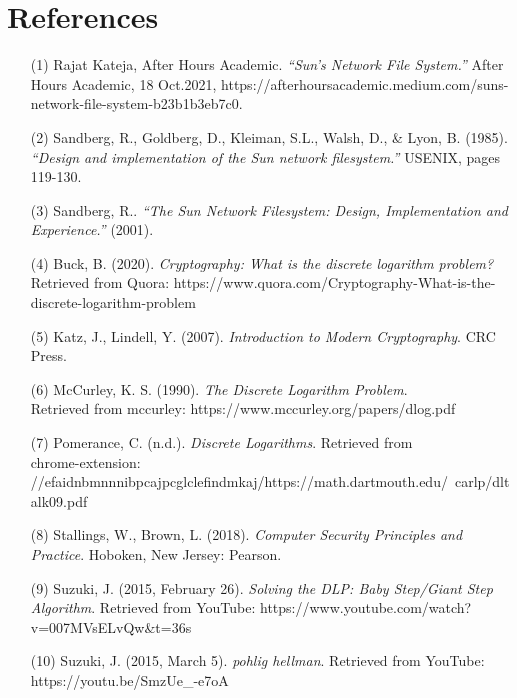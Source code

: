 \documentclass{article}
\begin{document}
\section{References} 

\begin{itemize}
    \item[(1)]Rajat Kateja, After Hours Academic. \textit{“Sun's Network File System.”} After Hours Academic, 18 Oct.2021, https://afterhoursacademic.medium.com/suns-network-file-system-b23b1b3eb7c0. 

    \item[(2)]Sandberg, R., Goldberg, D., Kleiman, S.L., Walsh, D., \& Lyon, B. (1985). \textit{“Design and implementation of the Sun network filesystem.”} USENIX, pages 119-130.

    \item[(3)]Sandberg, R.. \textit{“The Sun Network Filesystem: Design, Implementation and Experience.”} (2001).
    
    \item[(4)]Buck, B. (2020). \textit{Cryptography: What is the discrete logarithm problem?} Retrieved from Quora: https://www.quora.com/Cryptography-What-is-the-discrete-logarithm-problem
    
    \item[(5)]Katz, J.,  Lindell, Y. (2007). \textit{Introduction to Modern Cryptography}. CRC Press.
    
    \item[(6)]McCurley, K. S. (1990). \textit{The Discrete Logarithm Problem}. \\
    Retrieved from mccurley: https://www.mccurley.org/papers/dlog.pdf
    
    \item[(7)]Pomerance, C. (n.d.). \textit{Discrete Logarithms}. Retrieved from\\ 
    chrome-extension: \\
    //efaidnbmnnnibpcajpcglclefindmkaj/https://math.dartmouth.edu/~carlp/dltalk09.pdf
    
    \item[(8)]Stallings, W.,  Brown, L. (2018). \textit{Computer Security Principles and Practice}. Hoboken, New Jersey: Pearson.
    
    \item[(9)]Suzuki, J. (2015, February 26). \textit{Solving the DLP: Baby Step/Giant Step Algorithm}. Retrieved from YouTube: https://www.youtube.com/watch?v=007MVsELvQw\&t=36s
    
    \item[(10)]Suzuki, J. (2015, March 5). \textit{pohlig hellman}. Retrieved from YouTube: https://youtu.be/SmzUe\_-e7oA
    

\end{itemize}
\end{document}
